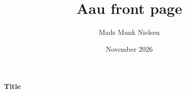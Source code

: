 \documentclass{article}
\title{Aau front page}
\author{Mads Munk Nielsen}
\date{November 2026}
\begin{document}
\maketitle

\begin{titlepage}
  \vspace*{6cm}
  {\Huge\bfseries Title}
\end{titlepage}
\end{document}

